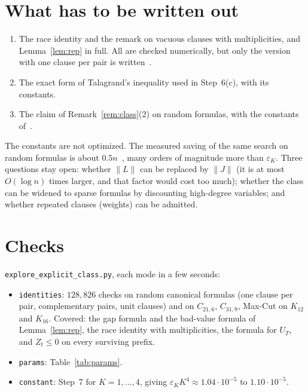 \documentclass[11pt,a4paper]{article}
\theoremstyle{definition}
\theoremstyle{remark}
\begin{document}
\section{What has to be written out}\label{sec:todo}

\begin{enumerate}
 \item The race identity and the remark on vacuous clauses with
 multiplicities, and Lemma~\ref{lem:rep} in full. All are checked numerically,
 but only the version with one clause per pair is written~\cite{N7,N8}.
 \item The exact form of Talagrand's inequality used in Step~6(c), with its
 constants.
 \item The claim of Remark~\ref{rem:class}(2) on random formulas, with the
 constants of~\cite{BvH16}.
\end{enumerate}
The constants are not optimized. The measured saving of the same search on
random formulas is about $0.5n$~\cite{N7}, many orders of magnitude more than
$\varepsilon_K$. Three questions stay open: whether $\|L\|$ can be replaced by
$\|J\|$ (it is at most $O(\log n)$ times larger, and that factor would cost
too much); whether the class can be widened to sparse formulas by discounting
high-degree variables; and whether repeated clauses (weights) can be admitted.

\section{Checks}\label{sec:checks}

\texttt{explore\_explicit\_class.py}, each mode in a few seconds:
\begin{itemize}
 \item \texttt{identities}: $128{,}826$ checks on random canonical formulas
 (one clause per pair, complementary pairs, unit clauses) and on $C_{21,6}$,
 $C_{31,9}$, Max-Cut on $K_{12}$ and $K_{16}$. Covered: the gap formula and
 the bad-value formula of Lemma~\ref{lem:rep}, the race identity with
 multiplicities, the formula for $U_T$, and $Z_t\le0$ on every surviving
 prefix.
 \item \texttt{params}: Table~\ref{tab:params}.
 \item \texttt{constant}: Step~7 for $K=1,\dots,4$, giving
 $\varepsilon_K K^4\approx1.04\cdot10^{-5}$ to $1.10\cdot10^{-5}$.
\end{itemize}
\end{document}
